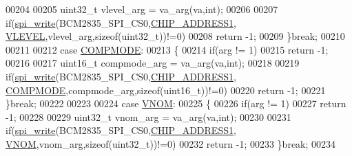 \begin{DoxyCode}
00204                                         
00205                     uint32\_t vlevel\_arg = va\_arg(va,\textcolor{keywordtype}{int});
00206                                         
00207                     \textcolor{keywordflow}{if}(\hyperlink{a00007_ga2770219ad8ad1eda1817c0df934b47d0}{spi\_write}(BCM2835\_SPI\_CS0,\hyperlink{a00037_a94de2b046db6e10257ef4481c0a15eaa}{CHIP\_ADDRESS1},
      \hyperlink{a00036_a601225f0680bfe13cf5fc0c2c52f37c5}{VLEVEL},vlevel\_arg,\textcolor{keyword}{sizeof}(uint32\_t))!=0)
00208                         \textcolor{keywordflow}{return} -1; 
00209                 \}\textcolor{keywordflow}{break};
00210                 
00211                 
00212                 \textcolor{keywordflow}{case} \hyperlink{a00036_a31c8d51fdc4d8181e8a66b9d4be2dd8c}{COMPMODE}:
00213                 \{
00214                         \textcolor{keywordflow}{if}(arg != 1)
00215                           \textcolor{keywordflow}{return} -1;
00216                                             
00217                         uint16\_t compmode\_arg = va\_arg(va,\textcolor{keywordtype}{int});
00218                                             
00219                         \textcolor{keywordflow}{if}(\hyperlink{a00007_ga2770219ad8ad1eda1817c0df934b47d0}{spi\_write}(BCM2835\_SPI\_CS0,\hyperlink{a00037_a94de2b046db6e10257ef4481c0a15eaa}{CHIP\_ADDRESS1},
      \hyperlink{a00036_a31c8d51fdc4d8181e8a66b9d4be2dd8c}{COMPMODE},compmode\_arg,\textcolor{keyword}{sizeof}(uint16\_t))!=0)
00220                             \textcolor{keywordflow}{return} -1; 
00221                 \}\textcolor{keywordflow}{break};
00222                 
00223                 
00224                 \textcolor{keywordflow}{case} \hyperlink{a00036_a7f5107f4dbb40b5aa9f3e6de81d5b1e9}{VNOM}:
00225                 \{
00226                         \textcolor{keywordflow}{if}(arg != 1)
00227                           \textcolor{keywordflow}{return} -1;
00228                                             
00229                         uint32\_t vnom\_arg = va\_arg(va,\textcolor{keywordtype}{int});
00230                                   
00231                         \textcolor{keywordflow}{if}(\hyperlink{a00007_ga2770219ad8ad1eda1817c0df934b47d0}{spi\_write}(BCM2835\_SPI\_CS0,\hyperlink{a00037_a94de2b046db6e10257ef4481c0a15eaa}{CHIP\_ADDRESS1},
      \hyperlink{a00036_a7f5107f4dbb40b5aa9f3e6de81d5b1e9}{VNOM},vnom\_arg,\textcolor{keyword}{sizeof}(uint32\_t))!=0)
00232                             \textcolor{keywordflow}{return} -1; 
00233                 \}\textcolor{keywordflow}{break};
00234                         

\end{DoxyCode}
